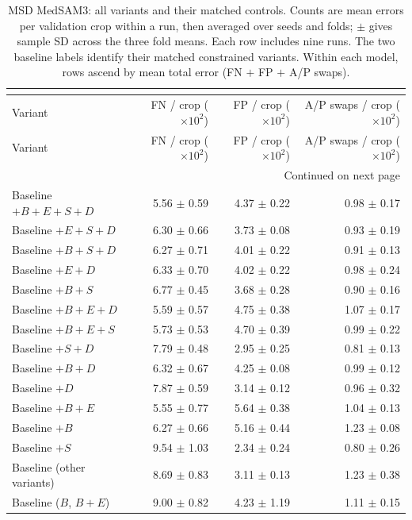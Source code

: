 \begingroup\footnotesize{}
\setlength{\tabcolsep}{4pt}
\renewcommand{\arraystretch}{1.12}
\begin{longtable}{@{}lrrr@{}}
\caption{MSD MedSAM3: all variants and their matched controls. Counts are mean errors per validation crop within a run, then averaged over seeds and folds; $\pm$ gives sample SD across the three fold means. Each row includes nine runs. The two baseline labels identify their matched constrained variants. Within each model, rows ascend by mean total error (FN $+$ FP $+$ A/P swaps).}
\label{tab:medsam-msd-all-errors}\label{tab:medsam-noaug-errors}\label{tab:medsam-noaug-error-ledger}\\
\hline
Variant & \shortstack{FN / crop\\($\times 10^{2}$)} & \shortstack{FP / crop\\($\times 10^{2}$)} & \shortstack{A/P swaps / crop\\($\times 10^{2}$)} \\ \hline
\endfirsthead
\hline
Variant & \shortstack{FN / crop\\($\times 10^{2}$)} & \shortstack{FP / crop\\($\times 10^{2}$)} & \shortstack{A/P swaps / crop\\($\times 10^{2}$)} \\ \hline
\endhead
\hline
\multicolumn{4}{r}{Continued on next page}\\
\endfoot
\hline\endlastfoot
Baseline $+B+E+S+D$ & 5.56 $\pm$ 0.59 & 4.37 $\pm$ 0.22 & 0.98 $\pm$ 0.17 \\
Baseline $+E+S+D$ & 6.30 $\pm$ 0.66 & 3.73 $\pm$ 0.08 & 0.93 $\pm$ 0.19 \\
Baseline $+B+S+D$ & 6.27 $\pm$ 0.71 & 4.01 $\pm$ 0.22 & 0.91 $\pm$ 0.13 \\
Baseline $+E+D$ & 6.33 $\pm$ 0.70 & 4.02 $\pm$ 0.22 & 0.98 $\pm$ 0.24 \\
Baseline $+B+S$ & 6.77 $\pm$ 0.45 & 3.68 $\pm$ 0.28 & 0.90 $\pm$ 0.16 \\
Baseline $+B+E+D$ & 5.59 $\pm$ 0.57 & 4.75 $\pm$ 0.38 & 1.07 $\pm$ 0.17 \\
Baseline $+B+E+S$ & 5.73 $\pm$ 0.53 & 4.70 $\pm$ 0.39 & 0.99 $\pm$ 0.22 \\
Baseline $+S+D$ & 7.79 $\pm$ 0.48 & 2.95 $\pm$ 0.25 & 0.81 $\pm$ 0.13 \\
Baseline $+B+D$ & 6.32 $\pm$ 0.67 & 4.25 $\pm$ 0.08 & 0.99 $\pm$ 0.12 \\
Baseline $+D$ & 7.87 $\pm$ 0.59 & 3.14 $\pm$ 0.12 & 0.96 $\pm$ 0.32 \\
Baseline $+B+E$ & 5.55 $\pm$ 0.77 & 5.64 $\pm$ 0.38 & 1.04 $\pm$ 0.13 \\
Baseline $+B$ & 6.27 $\pm$ 0.66 & 5.16 $\pm$ 0.44 & 1.23 $\pm$ 0.08 \\
Baseline $+S$ & 9.54 $\pm$ 1.03 & 2.34 $\pm$ 0.24 & 0.80 $\pm$ 0.26 \\
Baseline (other variants) & 8.69 $\pm$ 0.83 & 3.11 $\pm$ 0.13 & 1.23 $\pm$ 0.38 \\
Baseline ($B$, $B+E$) & 9.00 $\pm$ 0.82 & 4.23 $\pm$ 1.19 & 1.11 $\pm$ 0.15 \\
\end{longtable}
\endgroup

